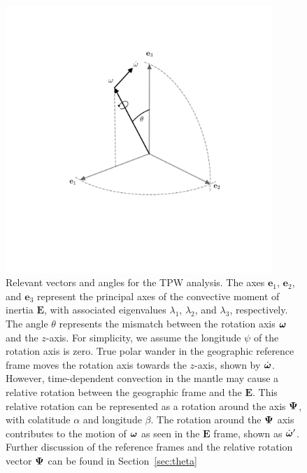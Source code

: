 \documentclass[extra,mreferee]{gji}
\begin{document}
\begin{figure}
\centering
\includegraphics[width=0.9\textwidth]{figures/reference_frames.pdf}
\caption{Relevant vectors and angles for the TPW analysis. The axes $\mathbf{e}_1$, $\mathbf{e}_2$, and $\mathbf{e}_3$ represent the principal axes of the convective moment of inertia $\mathbf{E}$, with associated eigenvalues $\lambda_1$, $\lambda_2$, and $\lambda_3$, respectively. The angle $\theta$ represents the mismatch between the rotation axis $\mitbf{\omega}$ and the $z$-axis. For simplicity, we assume the longitude $\psi$ of the rotation axis is zero. True polar wander in the geographic reference frame moves the rotation axis towards the $z$-axis, shown by $\dot{\mitbf{\omega}}$. However, time-dependent convection in the mantle may cause a relative rotation between the geographic frame and the $\mathbf{E}$. This relative rotation can be represented as a rotation around the axis $\mitbf{\Psi}$, with colatitude $\alpha$ and longitude $\beta$. The rotation around the $\mitbf{\Psi}$ axis contributes to the motion of $\mitbf{\omega}$ as seen in the $\mathbf{E}$ frame, shown as $\dot{\mitbf{\omega}}^\prime$. Further discussion of the reference frames and the relative rotation vector $\mitbf{\Psi}$ can be found in Section~\ref{sec:theta}}
\label{fig:reference_frames}
\end{figure}
\end{document}
